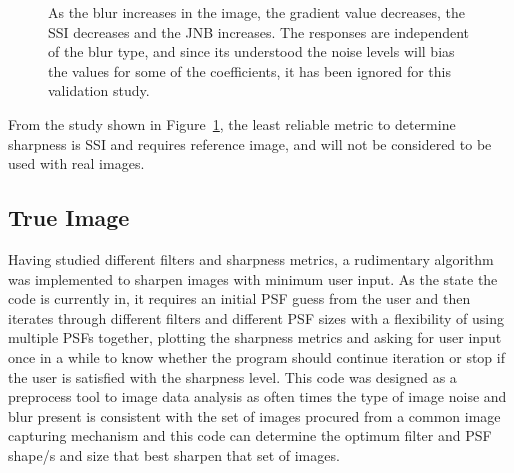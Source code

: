 \begin{figure}[h!]
        \caption{As the blur increases in the image, the gradient value decreases, the SSI decreases and the JNB increases. The responses are independent of the blur type, and since its understood the noise levels will bias the values for some of the  coefficients, it has been ignored for this validation study.} \label{fig:train_metrics}
\end{figure}

\noindent From the study shown in Figure~\ref{fig:train_metrics}, the least reliable metric to determine sharpness is SSI and requires reference image, and will not be considered to be used with real images.

\subsection{True Image}
Having studied different filters and sharpness metrics, a rudimentary algorithm was implemented to sharpen images with minimum user input. As the state the code is currently in, it requires an initial PSF guess from the user and then iterates through different filters and different PSF sizes with a flexibility of using multiple PSFs together, plotting the sharpness metrics and asking for user input once in a while to know whether the program should continue iteration or stop if the user is satisfied with the sharpness level. This code was designed as a preprocess tool to image data analysis as often times the type of image noise and blur present is consistent with the set of images procured from a common image capturing mechanism and this code can determine the optimum filter and PSF shape/s and size that best sharpen that set of images. 

